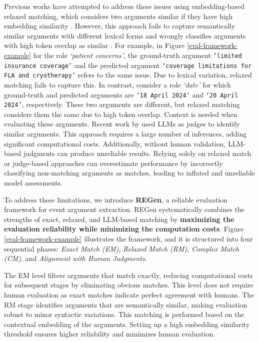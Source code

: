 Previous works have attempted to address these issues using embedding-based relaxed matching, which considers two arguments similar if they have high embedding similarity \cite{han2024empiricalstudyinformationextraction}. However, this approach fails to capture semantically similar arguments with different lexical forms and wrongly classifies arguments with high token overlap as similar \cite{sharif-etal-2024-explicit}. For example, in Figure \ref{eval-framework-example} for the role \textit{`patient concerns'}, the ground-truth argument \texttt{`limited insurance coverage'} and the predicted argument \texttt{`coverage limitations for FLA and cryotherapy'} refers to the same issue. Due to lexical variation, relaxed matching fails to capture this. In contrast, consider a role \textit{`date'} for which ground-truth and predicted arguments are \texttt{`18 April 2024'} and \texttt{`20 April 2024'}, respectively. These two arguments are different, but relaxed matching considers them the same due to high token overlap. Context is needed when evaluating these arguments. Recent work by  \citet{lu2024exactmatchsemanticallyreassessing} used LLMs as judges to identify similar arguments. This approach requires a large number of inferences, adding significant computational costs. Additionally, without human validation, LLM-based judgments can produce unreliable results.  Relying solely on relaxed match or judge-based approaches can overestimate performance by incorrectly classifying non-matching arguments as matches, leading to inflated and unreliable model assessments.

To address these limitations, we introduce \textbf{REGen}, a reliable evaluation framework for event argument extraction. REGen systematically combines the strengths of exact, relaxed, and LLM-based matching by \textbf{maximizing the evaluation reliability while minimizing the computation costs}. Figure \ref{eval-framework-example} illustrates the framework, and it is structured into four sequential phases: \textit{Exact Match (EM)}, \textit{Relaxed Match (RM)}, \textit{Complex Match (CM)}, and \textit{Alignment with Human Judgments}. 

The EM level filters arguments that match exactly, reducing computational costs for subsequent stages by eliminating obvious matches. This level does not require human evaluation as exact matches indicate perfect agreement with humans. The RM stage identifies arguments that are semantically similar, making evaluation robust to minor syntactic variations. This matching is performed based on the contextual embedding of the arguments. Setting up a high embedding similarity threshold ensures higher reliability and minimizes human evaluation. 

